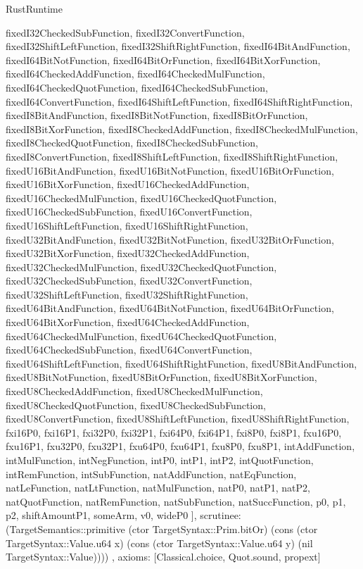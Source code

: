 \begin{lexlean}{RustRuntime}
\begin{semanticmodule}
{{      fixedI32CheckedSubFunction,
      fixedI32ConvertFunction,
      fixedI32ShiftLeftFunction,
      fixedI32ShiftRightFunction,
      fixedI64BitAndFunction,
      fixedI64BitNotFunction,
      fixedI64BitOrFunction,
      fixedI64BitXorFunction,
      fixedI64CheckedAddFunction,
      fixedI64CheckedMulFunction,
      fixedI64CheckedQuotFunction,
      fixedI64CheckedSubFunction,
      fixedI64ConvertFunction,
      fixedI64ShiftLeftFunction,
      fixedI64ShiftRightFunction,
      fixedI8BitAndFunction,
      fixedI8BitNotFunction,
      fixedI8BitOrFunction,
      fixedI8BitXorFunction,
      fixedI8CheckedAddFunction,
      fixedI8CheckedMulFunction,
      fixedI8CheckedQuotFunction,
      fixedI8CheckedSubFunction,
      fixedI8ConvertFunction,
      fixedI8ShiftLeftFunction,
      fixedI8ShiftRightFunction,
      fixedU16BitAndFunction,
      fixedU16BitNotFunction,
      fixedU16BitOrFunction,
      fixedU16BitXorFunction,
      fixedU16CheckedAddFunction,
      fixedU16CheckedMulFunction,
      fixedU16CheckedQuotFunction,
      fixedU16CheckedSubFunction,
      fixedU16ConvertFunction,
      fixedU16ShiftLeftFunction,
      fixedU16ShiftRightFunction,
      fixedU32BitAndFunction,
      fixedU32BitNotFunction,
      fixedU32BitOrFunction,
      fixedU32BitXorFunction,
      fixedU32CheckedAddFunction,
      fixedU32CheckedMulFunction,
      fixedU32CheckedQuotFunction,
      fixedU32CheckedSubFunction,
      fixedU32ConvertFunction,
      fixedU32ShiftLeftFunction,
      fixedU32ShiftRightFunction,
      fixedU64BitAndFunction,
      fixedU64BitNotFunction,
      fixedU64BitOrFunction,
      fixedU64BitXorFunction,
      fixedU64CheckedAddFunction,
      fixedU64CheckedMulFunction,
      fixedU64CheckedQuotFunction,
      fixedU64CheckedSubFunction,
      fixedU64ConvertFunction,
      fixedU64ShiftLeftFunction,
      fixedU64ShiftRightFunction,
      fixedU8BitAndFunction,
      fixedU8BitNotFunction,
      fixedU8BitOrFunction,
      fixedU8BitXorFunction,
      fixedU8CheckedAddFunction,
      fixedU8CheckedMulFunction,
      fixedU8CheckedQuotFunction,
      fixedU8CheckedSubFunction,
      fixedU8ConvertFunction,
      fixedU8ShiftLeftFunction,
      fixedU8ShiftRightFunction,
      fxi16P0,
      fxi16P1,
      fxi32P0,
      fxi32P1,
      fxi64P0,
      fxi64P1,
      fxi8P0,
      fxi8P1,
      fxu16P0,
      fxu16P1,
      fxu32P0,
      fxu32P1,
      fxu64P0,
      fxu64P1,
      fxu8P0,
      fxu8P1,
      intAddFunction,
      intMulFunction,
      intNegFunction,
      intP0,
      intP1,
      intP2,
      intQuotFunction,
      intRemFunction,
      intSubFunction,
      natAddFunction,
      natEqFunction,
      natLeFunction,
      natLtFunction,
      natMulFunction,
      natP0,
      natP1,
      natP2,
      natQuotFunction,
      natRemFunction,
      natSubFunction,
      natSuccFunction,
      p0,
      p1,
      p2,
      shiftAmountP1,
      someArm,
      v0,
      wideP0
    ],
    scrutinee: (TargetSemantics::primitive (ctor TargetSyntax::Prim.bitOr) (cons (ctor TargetSyntax::Value.u64 x) (cons (ctor TargetSyntax::Value.u64 y) (nil TargetSyntax::Value))))
  },
  axioms: [Classical.choice, Quot.sound, propext]
}


\end{semanticmodule}
\end{lexlean}
